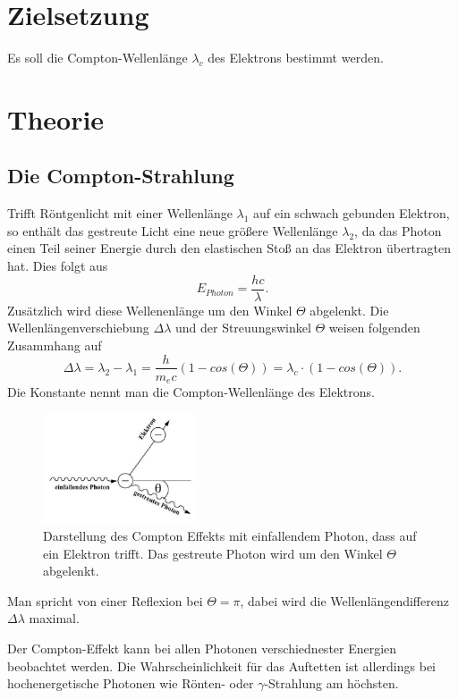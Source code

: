 \newpage
\section*{Zielsetzung}
Es soll die Compton-Wellenlänge $\lambda_c$ des Elektrons bestimmt werden.
\section{Theorie}
\subsection{Die Compton-Strahlung}
\label{sec:theorie}
Trifft Röntgenlicht mit einer Wellenlänge $\lambda_1$ auf ein schwach gebunden Elektron, so enthält das gestreute Licht eine neue 
größere Wellenlänge $\lambda_2$, da das Photon einen Teil seiner Energie durch den elastischen Stoß
an das Elektron übertragten hat. 
Dies folgt aus 
\begin{equation}
    E_{Photon}=\frac{hc}{\lambda}.
    \label{eqn:energie}
\end{equation}
Zusätzlich wird diese Wellenenlänge um den Winkel $\Theta$ abgelenkt.
Die Wellenlängenverschiebung $\Delta \lambda$ und der Streuungswinkel 
$\Theta$ weisen folgenden Zusammhang auf
\begin{equation}
    \Delta \lambda = \lambda_2 - \lambda_1 =\frac{h}{m_e c}\left(1-cos(\Theta)\right)=\lambda_c \cdot \left(1-cos(\Theta)\right).
    \label{eqn:compton}
\end{equation}
Die Konstante nennt man die Compton-Wellenlänge des Elektrons.
\begin{figure}
    \centering
    \includegraphics[width=0.4\textwidth]{compton/compton_effekt.jpg}
    \caption{Darstellung des Compton Effekts mit einfallendem Photon, dass
    auf ein Elektron trifft. Das gestreute Photon wird um den Winkel $\Theta$
    abgelenkt.}
\end{figure}
Man spricht von einer Reflexion bei $\Theta=\pi$, dabei wird die Wellenlängendifferenz
$\Delta \lambda$ maximal.

Der Compton-Effekt kann bei allen Photonen verschiednester Energien beobachtet werden.
Die Wahrscheinlichkeit für das Auftetten ist allerdings bei hochenergetische Photonen wie
Rönten- oder $\gamma$-Strahlung am höchsten.

